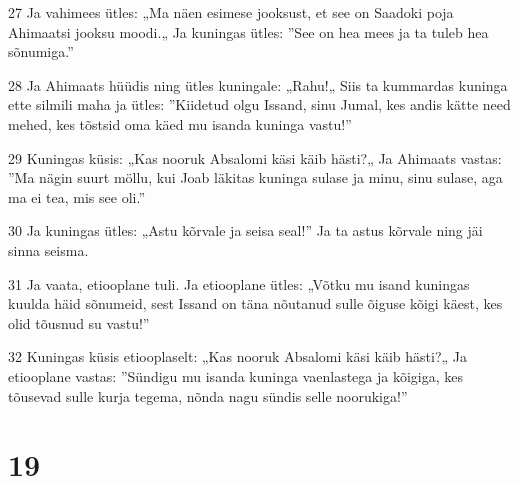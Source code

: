 \par 27 Ja vahimees ütles: „Ma näen esimese jooksust, et see on Saadoki poja Ahimaatsi jooksu moodi.„ Ja kuningas ütles: ”See on hea mees ja ta tuleb hea sõnumiga.”
\par 28 Ja Ahimaats hüüdis ning ütles kuningale: „Rahu!„ Siis ta kummardas kuninga ette silmili maha ja ütles: ”Kiidetud olgu Issand, sinu Jumal, kes andis kätte need mehed, kes tõstsid oma käed mu isanda kuninga vastu!”
\par 29 Kuningas küsis: „Kas nooruk Absalomi käsi käib hästi?„ Ja Ahimaats vastas: ”Ma nägin suurt möllu, kui Joab läkitas kuninga sulase ja minu, sinu sulase, aga ma ei tea, mis see oli.”
\par 30 Ja kuningas ütles: „Astu kõrvale ja seisa seal!” Ja ta astus kõrvale ning jäi sinna seisma.
\par 31 Ja vaata, etiooplane tuli. Ja etiooplane ütles: „Võtku mu isand kuningas kuulda häid sõnumeid, sest Issand on täna nõutanud sulle õiguse kõigi käest, kes olid tõusnud su vastu!”
\par 32 Kuningas küsis etiooplaselt: „Kas nooruk Absalomi käsi käib hästi?„ Ja etiooplane vastas: ”Sündigu mu isanda kuninga vaenlastega ja kõigiga, kes tõusevad sulle kurja tegema, nõnda nagu sündis selle noorukiga!”

\chapter{19}

